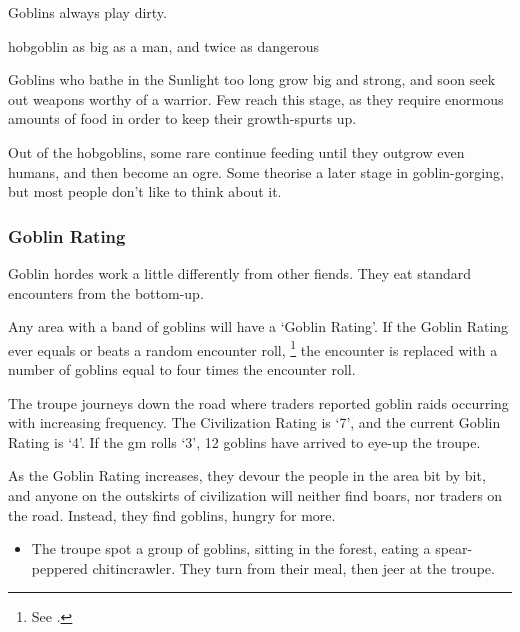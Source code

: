 \begin{multicols}{2}
Goblins always play dirty.


  {hobgoblin}%
  {as big as a man, and twice as dangerous}%

Goblins who bathe in the Sunlight too long grow big and strong, and soon seek out weapons worthy of a warrior.
Few reach this stage, as they require enormous amounts of food in order to keep their growth-spurts up.

Out of the hobgoblins, some rare continue feeding until they outgrow even humans, and then become an ogre.
Some theorise a later stage in goblin-gorging, but most people don't like to think about it.


\subsubsection{Goblin Rating}
\label{goblin_rating}

Goblin hordes work a little differently from other fiends.
They eat standard encounters from the bottom-up.

Any area with a band of goblins will have a `Goblin Rating'.
If the Goblin Rating ever equals or beats a random encounter roll,%
\footnote{See .}
the encounter is replaced with a number of goblins equal to four times the encounter roll.

\begin{exampletext}
  The troupe journeys down the road where traders reported goblin raids occurring with increasing frequency.
  The Civilization Rating is `7', and the current Goblin Rating is `4'.
  If the \gls{gm} rolls `3', 12 goblins have arrived to eye-up the troupe.
\end{exampletext}

\exampleGoblinEnc

As the Goblin Rating increases, they devour the people in the area bit by bit, and anyone on the outskirts of civilization will neither find boars, nor traders on the road.
Instead, they find goblins, hungry for more.



\showEnc[N]

\begin{itemize}
  \item
  The troupe spot a group of goblins, sitting in the forest, eating a spear-peppered chitincrawler.
  They turn from their meal, then jeer at the troupe.


\end{itemize}
\end{multicols}
